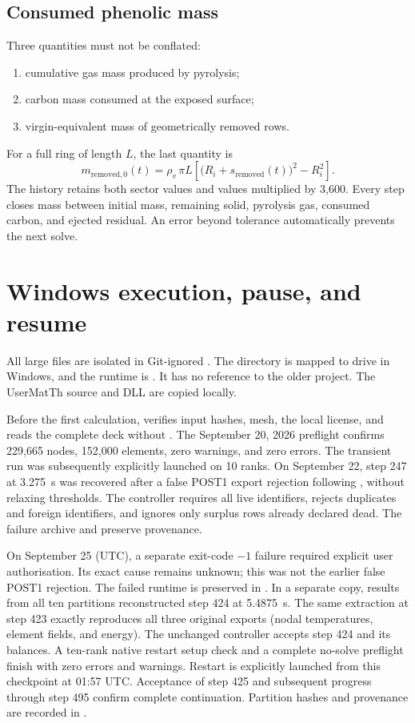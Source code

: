 \documentclass[oneside,openany]{amsdtx}
\begin{document}
\subsection{Consumed phenolic mass}
Three quantities must not be conflated:
\begin{enumerate}[nosep]
\item cumulative gas mass produced by pyrolysis;
\item carbon mass consumed at the exposed surface;
\item virgin-equivalent mass of geometrically removed rows.
\end{enumerate}
For a full ring of length \(L\), the last quantity is
\[
m_{\mathrm{removed},0}(t)=\rho_v\,\pi L
\left[\bigl(R_i+s_{\mathrm{removed}}(t)\bigr)^2-R_i^2\right].
\]
The history retains both sector values and values multiplied by 3,600. Every
step closes mass between initial mass, remaining solid, pyrolysis gas, consumed
carbon, and ejected residual. An error beyond tolerance automatically prevents
the next solve.



\section{Windows execution, pause, and resume}
All large files are isolated in Git-ignored . The 
directory is mapped to drive  in Windows, and the runtime is
. It has no reference to
the older project. The UserMatTh source and DLL are copied locally.

Before the first calculation,  verifies input
hashes, mesh, the local  license, and reads the complete
deck without . The September 20, 2026 preflight confirms 229,665
nodes, 152,000 elements, zero warnings, and zero errors. The transient run was
subsequently explicitly launched on 10 ranks. On September 22, step 247 at
\SI{3.275}{s} was recovered after a false POST1 export rejection following
, without relaxing thresholds. The controller requires all live
identifiers, rejects duplicates and foreign identifiers, and ignores only
surplus rows already declared dead. The failure archive and
 preserve provenance.

On September 25 (UTC), a separate exit-code \(-1\) failure required explicit
user authorisation. Its exact cause remains unknown; this was not the earlier
false POST1 rejection. The failed runtime is preserved in
. In a separate copy, results
from all ten partitions reconstructed step 424 at \SI{5.4875}{s}. The same
extraction at step 423 exactly reproduces all three original exports (nodal
temperatures, element fields, and energy). The unchanged controller accepts
step 424 and its balances. A ten-rank native restart setup check and a complete
no-solve preflight finish with zero errors and warnings. Restart is explicitly
launched from this checkpoint at 01:57 UTC. Acceptance of step 425 and subsequent
progress through step 495 confirm complete continuation. Partition hashes and provenance are recorded in
.
\end{document}
